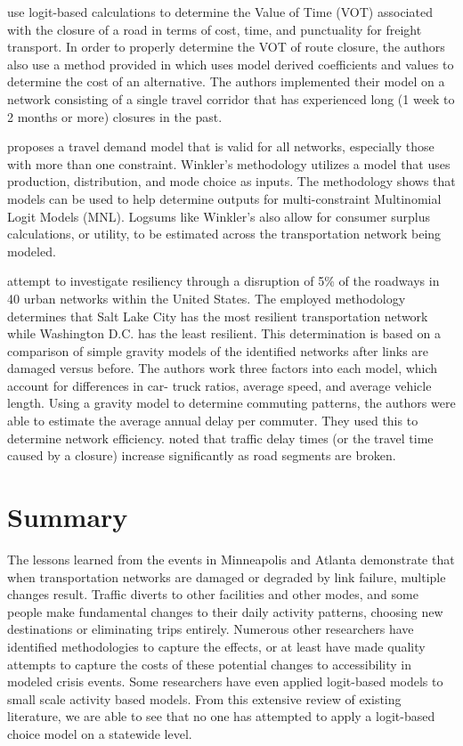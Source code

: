 \citet{Masiero2012} use logit-based calculations to determine the Value of
Time (VOT) associated with the closure of a road in terms of cost, time,
and punctuality for freight transport. In order to properly determine the
VOT of route closure, the authors also use a method provided in
\citet{koppelman2006} which uses model derived coefficients and values to
determine the cost of an alternative. The authors implemented their
model on a network consisting of a single travel corridor that has
experienced long (1 week to 2 months or more) closures in the past.

\citet{winkler2016} proposes a travel demand model that is valid for all
networks,
especially those with more than one constraint.
Winkler’s methodology
utilizes a
model that uses production, distribution, and mode choice as inputs. The
methodology shows that models can be used to help determine outputs for
multi-constraint Multinomial Logit Models (MNL). Logsums like Winkler’s
also allow for consumer surplus calculations,
or utility, to be estimated across the transportation network
being modeled.

\citet{ganin2017} attempt to investigate resiliency through a disruption
of 5\% of the roadways
in 40 urban networks within the United States. The employed methodology
determines that Salt Lake
City has the most resilient transportation network while Washington D.C.
has the least resilient.
This determination is based on a comparison of simple gravity models of the identified networks after links are
damaged versus before.
The authors work three factors into each model, which account for
differences in car-
truck ratios, average speed, and average vehicle length. Using a gravity
model to determine commuting patterns, the authors were
able to estimate the average
annual delay per commuter. They used this to determine network efficiency.
\citet{ganin2017} noted that
traffic delay times (or the travel time caused by a closure) increase
significantly as road segments are broken.

\section{Summary}

The lessons learned from the events in Minneapolis and Atlanta demonstrate
that when
transportation networks are damaged or degraded by link failure, multiple
changes result. Traffic
diverts to other facilities and other modes, and some people make
fundamental changes to their
daily activity patterns, choosing new destinations or eliminating trips
entirely. Numerous other
researchers have identified methodologies to capture the effects, or at
least have made quality attempts to capture the costs of these
potential changes to accessibility in modeled crisis events. Some researchers
have even applied logit-based models to small scale activity based models.
From this extensive review of existing literature, we are able to see that no
one has attempted to apply a logit-based choice model on a statewide level.

